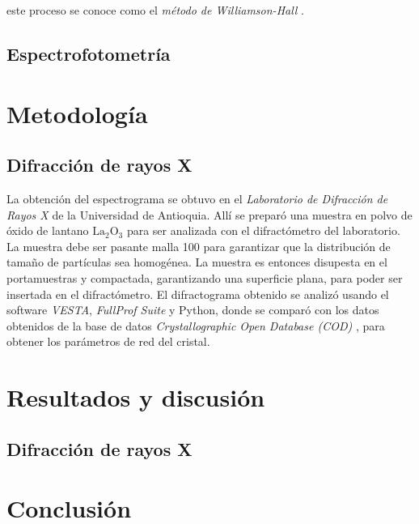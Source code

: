 \documentclass[final,5p,times,twocolumn, nopreprintline]{elsarticle}
\numberwithin{equation}{section}
\begin{document}
este proceso se conoce como el \emph{método de Williamson-Hall} \cite{himabindu2021microstructural}.


\subsection{Espectrofotometría}

\section{Metodología}

\subsection{Difracción de rayos X}

La obtención del espectrograma se obtuvo en el \textit{Laboratorio de Difracción de Rayos X} de la Universidad de Antioquia. Allí se preparó una muestra en polvo de óxido de lantano $\text{La}_2\text{O}_3$ para ser analizada con el difractómetro del laboratorio. La muestra debe ser pasante malla 100 para garantizar que la distribución de tamaño de partículas sea homogénea. La muestra es entonces disupesta en el portamuestras y compactada, garantizando una superficie plana, para poder ser insertada en el difractómetro. El difractograma obtenido se analizó usando el software \textit{VESTA}, \textit{FullProf Suite} y Python, donde se comparó con los datos obtenidos de la base de datos \textit{Crystallographic Open Database (COD)} \cite{zachariasen1926kristallstruktur}, para obtener los parámetros de red del cristal.

\section{Resultados y discusión}

\subsection{Difracción de rayos X}



\section{Conclusión}

 

%
%






\end{document}
